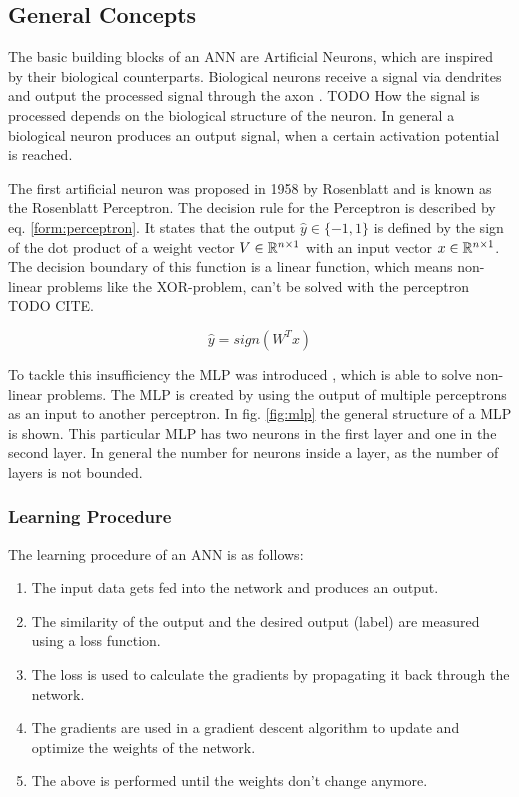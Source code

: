 \subsection{General Concepts}
\label{sec:deep_basics}

The basic building blocks of an \ac{ANN} are Artificial Neurons, which are inspired by  their biological counterparts.
Biological neurons receive a signal via dendrites and output the processed signal through the axon \cite{bioneuron}.
TODO How the signal is processed depends on the biological structure of the neuron.
In general a biological neuron produces an output signal, when a certain activation potential is reached.

The first artificial neuron was proposed in 1958 by Rosenblatt \cite{perceptron} and is known as the Rosenblatt Perceptron.
The decision rule for the Perceptron is described by eq. \ref{form:perceptron}.
It states that the output $\hat{y} \in \{-1, 1\}$ is defined by the sign of the dot product of a weight vector $V \in \mathbb{R}^{n \times 1}$ with an input vector $x \in \mathbb{R}^{n \times 1}$.
The decision boundary of this function is a linear function, which means non-linear problems like the XOR-problem, can't be solved with the perceptron TODO CITE.

\begin{equation}
    \hat{y} = sign(W^Tx)
    \label{form:perceptron}
\end{equation}

To tackle this insufficiency the \ac{MLP} was introduced \cite{mlp}, which is able to solve non-linear problems.
The \ac{MLP} is created by using the output of multiple perceptrons as an input to another perceptron.
In fig. \ref{fig:mlp} the general structure of a \ac{MLP} is shown.
This particular \ac{MLP} has two neurons in the first layer and one in the second layer.
In general the number for neurons inside a layer, as the number of layers is not bounded.

\subsubsection{Learning Procedure}
The learning procedure of an \ac{ANN} is as follows:

\begin{enumerate}
    \item The input data gets fed into the network and produces an output.
    \item The similarity of the output and the desired output (label) are measured using a loss function.
    \item The loss is used to calculate the gradients by propagating it back through the network.
    \item The gradients are used in a gradient descent algorithm to update and optimize the weights of the network.
    \item The above is performed until the weights don't change anymore.
\end{enumerate}

